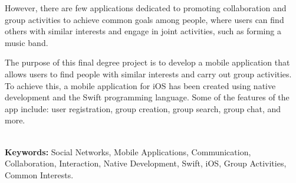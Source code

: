\documentclass{book}
\begin{document}
However, there are few applications dedicated to promoting collaboration 
and group activities to achieve common goals among people, where users can 
find others with similar interests and engage in joint activities, such as 
forming a music band.

The purpose of this final degree project is to develop a mobile application 
that allows users to find people with similar interests and carry out group 
activities. To achieve this, a mobile application for iOS has been created 
using native development and the Swift programming language. Some of the 
features of the app include: user registration, group creation, group search, 
group chat, and more.

\textbf{\\\large Keywords: } Social Networks, Mobile Applications, Communication, Collaboration, Interaction, Native Development, Swift, iOS, Group Activities, Common Interests.
\endgroup

\tableofcontents
\end{document}
